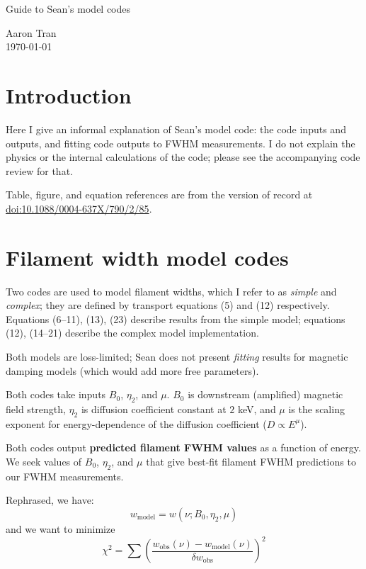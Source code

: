 \documentclass[10pt]{article}
\newcommand{\mt}{\mathrm}
\begin{document}
\begin{center}
    \Large{Guide to Sean's model codes}

    \normalsize{Aaron Tran}\\
    \today \\
\end{center}

\section{Introduction}

Here I give an informal explanation of Sean's model code: the code inputs and
outputs, and fitting code outputs to FWHM measurements. I do not explain the
physics or the internal calculations of the code; please see the accompanying
code review for that.

Table, figure, and equation references are from the version of record at
\href{http://dx.doi.org/10.1088/0004-637X/790/2/85}
{doi:10.1088/0004-637X/790/2/85}.

\section{Filament width model codes}

Two codes are used to model filament widths, which I refer to as \emph{simple}
and \emph{complex}; they are defined by transport equations (5) and (12)
respectively.  Equations (6--11), (13), (23) describe results from the simple
model; equations (12), (14--21) describe the complex model implementation.

Both models are loss-limited; Sean does not present \emph{fitting} results for
magnetic damping models (which would add more free parameters).

Both codes take inputs $B_0$, $\eta_2$, and $\mu$.
$B_0$ is downstream (amplified) magnetic field strength, $\eta_2$ is diffusion
coefficient constant at $2$ keV, and $\mu$ is the scaling exponent for
energy-dependence of the diffusion coefficient ($D \propto E^\mu$).

Both codes output \textbf{predicted filament FWHM values} as a function of
energy.  We seek values of $B_0$, $\eta_2$, and $\mu$ that give best-fit
filament FWHM predictions to our FWHM measurements.

Rephrased, we have:
\[
    w_{\mt{model}} = w(\nu; B_0, \eta_2, \mu)
\]
and we want to minimize
\[
    \chi^2 = \sum \left( \frac{w_{\mt{obs}}(\nu) - w_{\mt{model}}(\nu)}
                       { \delta w_{\mt{obs}} } \right)^2
\]
\end{document}
